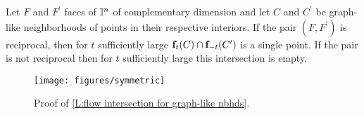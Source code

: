 \begin{lemma}\label{L:flow intersection for graph-like nbhds}
	Let $F$ and $F^\prime$ faces of $\mathbb{I}^n$ of complementary dimension and let $C$ and $C^\prime$ be graph-like neighborhoods of points in their respective interiors.
	If the pair $(F,F^\prime)$ is reciprocal, then for $t$ sufficiently large $\mathbf{f}_t(C) \cap \mathbf{f}_{-t}(C^\prime)$ is a single point.
	If the pair is not reciprocal then for $t$ sufficiently large this intersection is empty.
\end{lemma}

\begin{figure}[!h]
	\texttt{[image: figures/symmetric]}
	\caption{Proof of \cref{L:flow intersection for graph-like nbhds}.}
	\label{F:intersection}
\end{figure}

